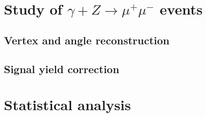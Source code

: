 \section{Study of $\gamma + Z \rightarrow \mu^+ \mu^-$ events }

\subsection{Vertex and angle reconstruction}

\subsection{Signal yield correction}

\section{Statistical analysis}

